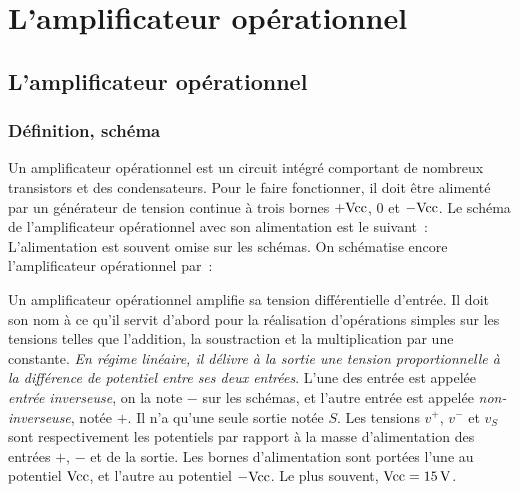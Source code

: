 \chapter{L'amplificateur opérationnel}
\minitoc{}
\minilof{}
\minilot{}
%
\section{L'amplificateur opérationnel}
\subsection{Définition, schéma}
Un amplificateur opérationnel est un circuit intégré comportant de nombreux transistors et des condensateurs. Pour le faire fonctionner, il doit être alimenté par un générateur de tension continue à trois bornes \(+\textrm{Vcc}\), \(0\) et \(-\textrm{Vcc}\). Le schéma de l'amplificateur opérationnel avec son alimentation est le suivant~:
L'alimentation est souvent omise sur les schémas. On schématise encore l'amplificateur opérationnel par~:

Un amplificateur opérationnel amplifie sa tension différentielle d'entrée. Il doit son nom à ce qu'il servit d'abord pour la réalisation d'opérations simples sur les tensions telles que l'addition, la soustraction et la multiplication par une constante. \emph{En régime linéaire, il délivre à la sortie une tension proportionnelle à la différence de potentiel entre ses deux entrées}. L'une des entrée est appelée \emph{entrée inverseuse}, on la note \(-\) sur les schémas, et l'autre entrée est appelée \emph{non-inverseuse}, notée \(+\). Il n'a qu'une seule sortie notée \(S\). Les tensions \(v^+\), \(v^-\) et \(v_S\) sont respectivement les potentiels par rapport à la masse d'alimentation des entrées \(+\), \(-\) et de la sortie. Les bornes d'alimentation sont portées l'une au potentiel \(\textrm{Vcc}\), et l'autre au potentiel \(-\textrm{Vcc}\). Le plus souvent, \(\textrm{Vcc} = \SI{15}{\volt}\).
